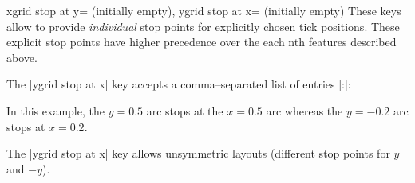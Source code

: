 \begin{pgfplotskeylist}{%
	xgrid stop at y= (initially empty),
	ygrid stop at x= (initially empty)}
	These keys allow to provide \emph{individual} stop points for explicitly chosen tick positions. These explicit stop points have higher precedence over the each nth features described above.

	The |ygrid stop at x| key accepts a comma--separated list of entries |:|:
\begin{codeexample}[]
\begin{tikzpicture}
	\begin{smithchart}[
		ygrid stop at x={0.5:0.5,-0.2:0.2}
	]
	\end{smithchart}
\end{tikzpicture}
\end{codeexample}
	\noindent In this example, the $y=0.5$ arc stops at the $x=0.5$ arc whereas the $y=-0.2$ arc stops at $x=0.2$.

	The |ygrid stop at x| key allows unsymmetric layouts (different stop points for $y$ and $-y$).
\end{pgfplotskeylist}
\endgroup
